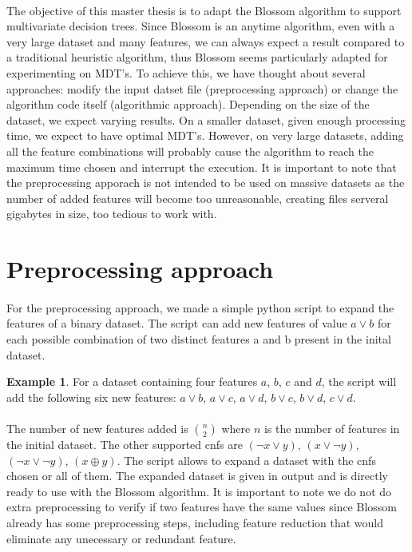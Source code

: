 \documentclass[12pt]{report}
\theoremstyle{definition}
\newtheorem*{example}{Example}
\theoremstyle{definition}
\theoremstyle{definition}
\begin{document}
\paragraph{} The objective of this master thesis is to adapt the Blossom algorithm to support multivariate
decision trees. Since Blossom is an anytime algorithm, even with a very large dataset and many features,
we can always expect a result compared to a traditional heuristic algorithm, thus Blossom seems particularly
adapted for experimenting on MDT's. To achieve this, we have thought about several approaches: modify the
input datset file (preprocessing approach) or change the algorithm code itself (algorithmic approach).
Depending on the size of the dataset, we expect varying results. On a smaller dataset, given enough
processing time, we expect to have optimal MDT's. However, on very large datasets, adding all the feature
combinations will probably cause the algorithm to reach the maximum time chosen and interrupt the execution.
It is important to note that the preprocessing apporach is not intended to be used on massive datasets as
the number of added features will become too unreasonable, creating files serveral gigabytes in size,
too tedious to work with. 

\section{Preprocessing approach}
\paragraph{} For the preprocessing approach, we made a simple python script to expand the features of a binary
dataset. The script can add new features of value $a \lor b$ for each possible combination of two distinct
features a and b present in the inital dataset.

\begin{example}
    For a dataset containing four features $a$, $b$, $c$ and $d$, the script will add the following six new
    features: $a \lor b$, $a \lor c$, $a \lor d$, $b \lor c$, $b \lor d$, $c \lor d$.
\end{example}

\paragraph{} The number of new features added is $n \choose 2$ where $n$ is the number of features in
the initial dataset. The other supported cnfs are $(\neg x \lor y)$, $(x \lor \neg y)$, $(\neg x \lor \neg y)$, 
$(x \oplus y)$. The script allows to expand a dataset with the cnfs chosen or all of them. The expanded
dataset is given in output and is directly ready to use with the Blossom algorithm. It is important to note
we do not do extra preprocessing to verify if two features have the same values since Blossom already has
some preprocessing steps, including feature reduction that would eliminate any unecessary or redundant feature.
\end{document}
